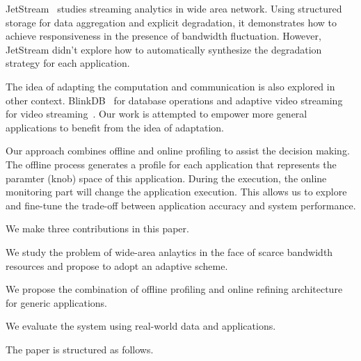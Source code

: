 JetStream~\cite{rabkin2014aggregation} studies streaming analytics in wide area
network. Using structured storage for data aggregation and explicit degradation,
it demonstrates how to achieve responsiveness in the presence of bandwidth
fluctuation. However, JetStream didn't explore how to automatically synthesize
the degradation strategy for each application.

The idea of adapting the computation and communication is also explored in other
context. BlinkDB~\cite{agarwal2013blinkdb} for database operations and adaptive
video streaming for video streaming~\cite{yin2015control}. Our work is attempted
to empower more general applications to benefit from the idea of adaptation.

Our approach combines offline and online profiling to assist the decision
making. The offline process generates a profile for each application that
represents the paramter (knob) space of this application. During the execution,
the online monitoring part will change the application execution. This allows us
to explore and fine-tune the trade-off between application accuracy and system
performance.


We make three contributions in this paper.

\squishlist    %
\item We study the problem of wide-area anlaytics in the face of scarce
  bandwidth resources and propose to adopt an adaptive scheme.
\item We propose the combination of offline profiling and online refining
  architecture for generic applications.
\item We evaluate the system using real-world data and applications.
\squishend     %

The paper is structured as follows.

